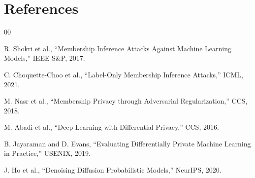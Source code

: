 \documentclass[conference]{IEEEtran}
\begin{document}
\section*{References}

\begin{thebibliography}{00}

R. Shokri et al., ``Membership Inference Attacks Against Machine Learning Models,'' IEEE S\&P, 2017.

C. Choquette-Choo et al., ``Label-Only Membership Inference Attacks,'' ICML, 2021.

M. Nasr et al., ``Membership Privacy through Adversarial Regularization,'' CCS, 2018.

M. Abadi et al., ``Deep Learning with Differential Privacy,'' CCS, 2016.

B. Jayaraman and D. Evans, ``Evaluating Differentially Private Machine Learning in Practice,'' USENIX, 2019.

J. Ho et al., ``Denoising Diffusion Probabilistic Models,'' NeurIPS, 2020.

\end{thebibliography}
\end{document}
